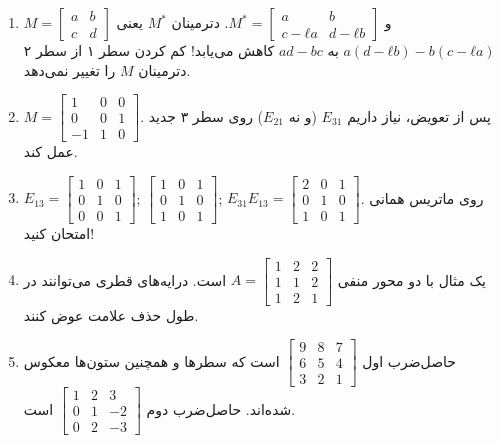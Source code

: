 \documentclass[12pt]{article}
\begin{document}
\begin{enumerate}
		\item $M= \begin{bmatrix} a & b \\ c & d \end{bmatrix}$ و $M^*= \begin{bmatrix} a & b \\ c-ℓa & d-ℓb \end{bmatrix}$. دترمینان $M^*$ یعنی $a(d-ℓb)-b(c-ℓa)$ به $ad-bc$ کاهش می‌یابد! کم کردن سطر ۱ از سطر ۲ دترمینان $M$ را تغییر نمی‌دهد.
		
		\item $M= \begin{bmatrix} 1 & 0 & 0 \\ 0 & 0 & 1 \\ -1 & 1 & 0 \end{bmatrix}$. پس از تعویض، نیاز داریم $E_{31}$ (و نه $E_{21}$) روی سطر ۳ جدید عمل کند.
		
		\item $E_{13}= \begin{bmatrix} 1 & 0 & 1 \\ 0 & 1 & 0 \\ 0 & 0 & 1 \end{bmatrix}$; $\begin{bmatrix} 1 & 0 & 1 \\ 0 & 1 & 0 \\ 1 & 0 & 1 \end{bmatrix}$; $E_{31}E_{13}= \begin{bmatrix} 2 & 0 & 1 \\ 0 & 1 & 0 \\ 1 & 0 & 1 \end{bmatrix}$. روی ماتریس همانی امتحان کنید!
		
		\item یک مثال با دو محور منفی $A= \begin{bmatrix} 1 & 2 & 2 \\ 1 & 1 & 2 \\ 1 & 2 & 1 \end{bmatrix}$ است. درایه‌های قطری می‌توانند در طول حذف علامت عوض کنند.
		
		\item حاصل‌ضرب اول $\begin{bmatrix} 9 & 8 & 7 \\ 6 & 5 & 4 \\ 3 & 2 & 1 \end{bmatrix}$ است که سطرها و همچنین ستون‌ها معکوس شده‌اند. حاصل‌ضرب دوم $\begin{bmatrix} 1 & 2 & 3 \\ 0 & 1 & -2 \\ 0 & 2 & -3 \end{bmatrix}$ است.
		

\end{enumerate}
\end{document}
